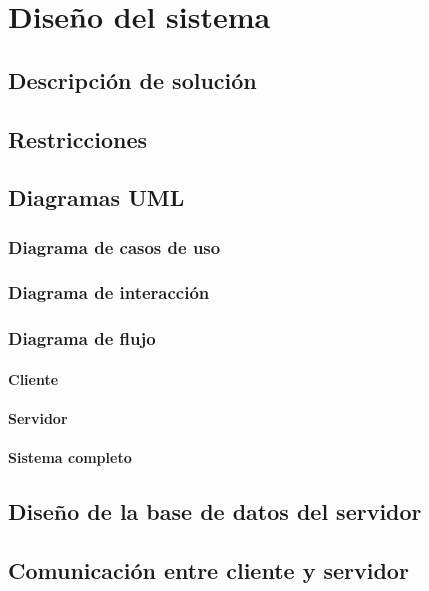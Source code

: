 \chapter{Diseño del sistema}
 
\section{Descripción de solución}

\section{Restricciones}
 
\section{Diagramas UML}

\subsection{Diagrama de casos de uso}

\subsection{Diagrama de interacción}

\subsection{Diagrama de flujo}

\subsubsection{Cliente}

\subsubsection{Servidor}

\subsubsection{Sistema completo}

\section{Diseño de la base de datos del servidor}

\section{Comunicación entre cliente y servidor}